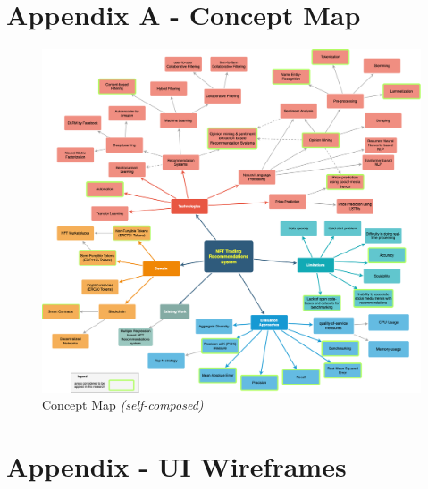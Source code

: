 

\chapter{Appendix A - Concept Map}
\label{appendix:A-concept-map}

\begin{figure}[h!]
\centering
\includegraphics[width=\textwidth]{images/appendix/concept-map.png}
\caption{Concept Map \textit{(self-composed)}}
\label{fig:concept-map}
\end{figure}



\chapter{Appendix  - UI Wireframes}
\label{appendix:UI-Wireframes}


